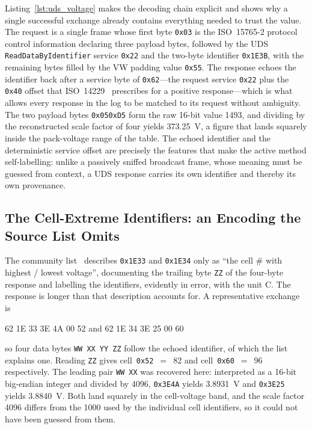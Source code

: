 \documentclass[11pt,a4paper,oneside,parskip=half]{scrreprt}
\newcommand{\udssid}[1]{\texttt{0x#1}}
\providecommand{\hex}{}\renewcommand{\hex}[1]{\texttt{0x#1}}
\begin{document}
Listing~\ref{lst:uds_voltage} makes the decoding chain explicit and shows why a single successful exchange already contains everything needed to trust the value. The request is a single frame whose first byte \hex{03} is the ISO~15765-2 protocol control information declaring three payload bytes, followed by the UDS \texttt{ReadDataByIdentifier} service \udssid{22} and the two-byte identifier \hex{1E3B}, with the remaining bytes filled by the VW padding value \hex{55}. The response echoes the identifier back after a service byte of \udssid{62}---the request service \udssid{22} plus the \hex{40} offset that ISO~14229~\cite{iso14229} prescribes for a positive response---which is what allows every response in the log to be matched to its request without ambiguity. The two payload bytes \hex{05}\hex{D5} form the raw 16-bit value 1493, and dividing by the reconstructed scale factor of four yields 373.25~V, a figure that lands squarely inside the pack-voltage range of the table. The echoed identifier and the deterministic service offset are precisely the features that make the active method self-labelling: unlike a passively sniffed broadcast frame, whose meaning must be guessed from context, a UDS response carries its own identifier and thereby its own provenance.

\subsection{The Cell-Extreme Identifiers: an Encoding the Source List Omits}
\label{ssec:cellextremes}
The community list~\cite{vwmebpidlist} describes \hex{1E33} and \hex{1E34} only as ``the cell \# with highest / lowest voltage'', documenting the trailing byte \texttt{ZZ} of the four-byte response and labelling the identifiers, evidently in error, with the unit \textdegree C. The response is longer than that description accounts for. A representative exchange is

\begin{center}
 62 1E 33 3E 4A 00 52 \qquad and  62 1E 34 3E 25 00 60
\end{center}

\noindent so four data bytes \texttt{WW XX YY ZZ} follow the echoed identifier, of which the list explains one. Reading \texttt{ZZ} gives cell~\hex{52}~$=$~82 and cell~\hex{60}~$=$~96 respectively. The leading pair \texttt{WW XX} was recovered here: interpreted as a 16-bit big-endian integer and divided by 4096, \hex{3E4A} yields 3.8931~V and \hex{3E25} yields 3.8840~V. Both land squarely in the cell-voltage band, and the scale factor 4096 differs from the 1000 used by the individual cell identifiers, so it could not have been guessed from them.
\end{document}
